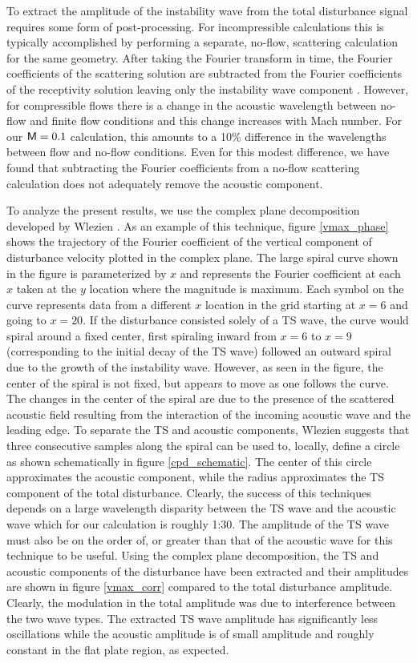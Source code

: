 To extract the amplitude of the instability wave from the total disturbance
signal requires some form of post-processing.  For incompressible calculations
this is typically accomplished by performing a separate, no-flow, scattering
calculation for the same geometry.  After taking the Fourier transform in
time, the Fourier coefficients of the scattering solution are subtracted from
the Fourier coefficients of the receptivity solution leaving only the
instability wave component \cite{Lin:92}.  However, for compressible flows
there is a change in the acoustic wavelength between no-flow and finite flow
conditions and this change increases with Mach number.  For our ${\sf M}=0.1$
calculation, this amounts to a 10\% difference in the wavelengths between flow
and no-flow conditions.  Even for this modest difference, we have found that
subtracting the Fourier coefficients from a no-flow scattering calculation
does not adequately remove the acoustic component.

To analyze the present results, we use the complex plane decomposition
developed by Wlezien \cite{Wlezien:94}.  As an example of this technique,
figure \ref{vmax_phase} shows the trajectory of the Fourier coefficient of the
vertical component of disturbance velocity plotted in the complex plane.  The
large spiral curve shown in the figure is parameterized by $x$ and represents
the Fourier coefficient at each $x$ taken at the $y$ location where the
magnitude is maximum.  Each symbol on the curve represents data from a
different $x$ location in the grid starting at $x=6$ and going to $x=20$.  If
the disturbance consisted solely of a TS wave, the curve would spiral around a
fixed center, first spiraling inward from $x=6$ to $x=9$ (corresponding to the
initial decay of the TS wave) followed an outward spiral due to the growth of
the instability wave.  However, as seen in the figure, the center of the
spiral is not fixed, but appears to move as one follows the curve.  The
changes in the center of the spiral are due to the presence of the scattered
acoustic field resulting from the interaction of the incoming acoustic wave
and the leading edge.  To separate the TS and acoustic components, Wlezien
\cite{Wlezien:94} suggests that three consecutive samples along the spiral can
be used to, locally, define a circle as shown schematically in figure
\ref{cpd_schematic}.  The center of this circle approximates the acoustic
component, while the radius approximates the TS component of the total
disturbance.  Clearly, the success of this techniques depends on a large
wavelength disparity between the TS wave and the acoustic wave which for our
calculation is roughly 1:30.  The amplitude of the TS wave must also be on the
order of, or greater than that of the acoustic wave for this technique to be
useful.  Using the complex plane decomposition, the TS and acoustic components
of the disturbance have been extracted and their amplitudes are shown in
figure \ref{vmax_corr} compared to the total disturbance amplitude.  Clearly,
the modulation in the total amplitude was due to interference between the two
wave types.  The extracted TS wave amplitude has significantly less
oscillations while the acoustic amplitude is of small amplitude and roughly
constant in the flat plate region, as expected.

